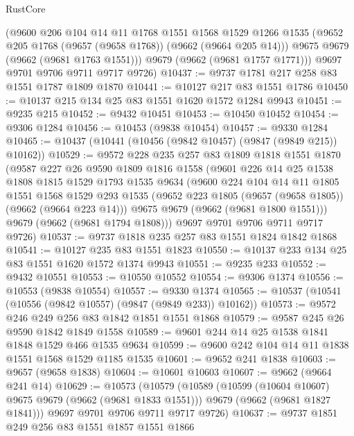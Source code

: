 \begin{lexlean}{RustCore}
\begin{coremodule}
        (@9600
          @206
          @104
          @14
          @11
          @1768
          @1551
          @1568
          @1529
          @1266
          @1535
          (@9652 @205 @1768 (@9657 (@9658 @1768)) (@9662 (@9664 @205 @14)))
          @9675
          @9679
          (@9662 (@9681 @1763 @1551)))
        @9679
        (@9662 (@9681 @1757 @1771)))
      @9697
      @9701
      @9706
      @9711
      @9717
      @9726)
@10437 := @9737 @1781 @217 @258 @83 @1551 @1787 @1809 @1870
@10441 := @10127 @217 @83 @1551 @1786
@10450 := @10137 @215 @134 @25 @83 @1551 @1620 @1572 @1284 @9943
@10451 := @9235 @215
@10452 := @9432 @10451
@10453 := @10450 @10452
@10454 := @9306 @1284
@10456 := @10453 (@9838 @10454)
@10457 := @9330 @1284
@10465 := @10437 (@10441 (@10456 (@9842 @10457) (@9847 (@9849 @215)) @10162))
@10529 := @9572
    @228
    @235
    @257
    @83
    @1809
    @1818
    @1551
    @1870
    (@9587
      @227
      @26
      @9590
      @1809
      @1816
      @1558
      (@9601
        @226
        @14
        @25
        @1538
        @1808
        @1815
        @1529
        @1793
        @1535
        @9634
        (@9600
          @224
          @104
          @14
          @11
          @1805
          @1551
          @1568
          @1529
          @293
          @1535
          (@9652 @223 @1805 (@9657 (@9658 @1805)) (@9662 (@9664 @223 @14)))
          @9675
          @9679
          (@9662 (@9681 @1800 @1551)))
        @9679
        (@9662 (@9681 @1794 @1808)))
      @9697
      @9701
      @9706
      @9711
      @9717
      @9726)
@10537 := @9737 @1818 @235 @257 @83 @1551 @1824 @1842 @1868
@10541 := @10127 @235 @83 @1551 @1823
@10550 := @10137 @233 @134 @25 @83 @1551 @1620 @1572 @1374 @9943
@10551 := @9235 @233
@10552 := @9432 @10551
@10553 := @10550 @10552
@10554 := @9306 @1374
@10556 := @10553 (@9838 @10554)
@10557 := @9330 @1374
@10565 := @10537 (@10541 (@10556 (@9842 @10557) (@9847 (@9849 @233)) @10162))
@10573 := @9572 @246 @249 @256 @83 @1842 @1851 @1551 @1868
@10579 := @9587 @245 @26 @9590 @1842 @1849 @1558
@10589 := @9601 @244 @14 @25 @1538 @1841 @1848 @1529 @466 @1535 @9634
@10599 := @9600 @242 @104 @14 @11 @1838 @1551 @1568 @1529 @1185 @1535
@10601 := @9652 @241 @1838
@10603 := @9657 (@9658 @1838)
@10604 := @10601 @10603
@10607 := @9662 (@9664 @241 @14)
@10629 := @10573
    (@10579
      (@10589
        (@10599 (@10604 @10607) @9675 @9679 (@9662 (@9681 @1833 @1551)))
        @9679
        (@9662 (@9681 @1827 @1841)))
      @9697
      @9701
      @9706
      @9711
      @9717
      @9726)
@10637 := @9737 @1851 @249 @256 @83 @1551 @1857 @1551 @1866

\end{coremodule}
\end{lexlean}
